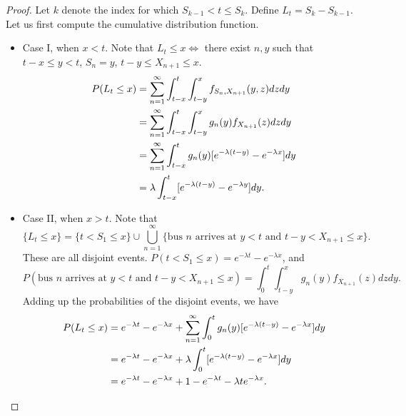\documentclass[15pt,a4paper]{book}
\theoremstyle{definition}
\begin{document}
\begin{proof}
    Let $k$ denote the index for which $S_{k-1} < t \leq S_{k}$. Define $L_{t} = S_{k} - S_{k-1}$. Let us first compute the cumulative distribution function.
    \begin{itemize}
        \item Case I, when $x < t$. Note that $L_{t} \leq x \iff$ there exist $n,y$ such that $t-x \leq y < t$, $S_{n} = y$, $t-y \leq X_{n+1} \leq x$.
        \begin{align}
            P(L_{t} \leq x) &= \sum_{n=1}^{\infty} \int_{t-x}^{t} \int_{t-y}^{x} f_{S_{n},X_{n+1}}(y,z) dz dy \notag \\
            &= \sum_{n=1}^{\infty} \int_{t-x}^{t} \int_{t-y}^{x} g_{n}(y) f_{X_{n+1}}(z) dz dy \notag \\
            &= \sum_{n=1}^{\infty} \int_{t-x}^{t} g_{n}(y) [e^{-\lambda(t-y)} - e^{-\lambda x}] dy \notag \\
            &= \lambda \int_{t-x}^{t} [e^{-\lambda(t-y)}-e^{-\lambda y}] dy.
        \end{align}
        
        \item Case II, when $x > t$. Note that
        \begin{equation}
            \{L_{t} \leq x\} = \{t < S_{1} \leq x \} \cup \bigcup_{n=1}^{\infty} \{\text{bus $n$ arrives at $y < t$ and $t-y < X_{n+1}\leq x$}\}.
        \end{equation}
        These are all disjoint events. $P(t < S_{1} \leq x) = e^{-\lambda t} - e^{-\lambda x}$, and
        \begin{equation}
            P(\text{bus $n$ arrives at $y < t$ and $t-y < X_{n+1}\leq x$}) = \int_{0}^{t} \int_{t-y}^{x} g_{n}(y) f_{X_{n+1}}(z) dz dy.
        \end{equation}
        Adding up the probabilities of the disjoint events, we have
        \begin{align}
            P(L_{t} \leq x) &= e^{-\lambda t} - e^{-\lambda x} + \sum_{n=1}^{\infty} \int_{0}^{t} g_{n}(y) [e^{-\lambda(t-y)} - e^{-\lambda x}] dy \notag \\
            &= e^{-\lambda t} - e^{-\lambda x} + \lambda \int_{0}^{t} [e^{-\lambda(t-y)}-e^{-\lambda x}]dy \notag \\
            &= e^{-\lambda t} - e^{-\lambda x} + 1 - e^{-\lambda t} - \lambda t e^{-\lambda x}.
        \end{align}
    \end{itemize}
\end{proof}


\end{document}
